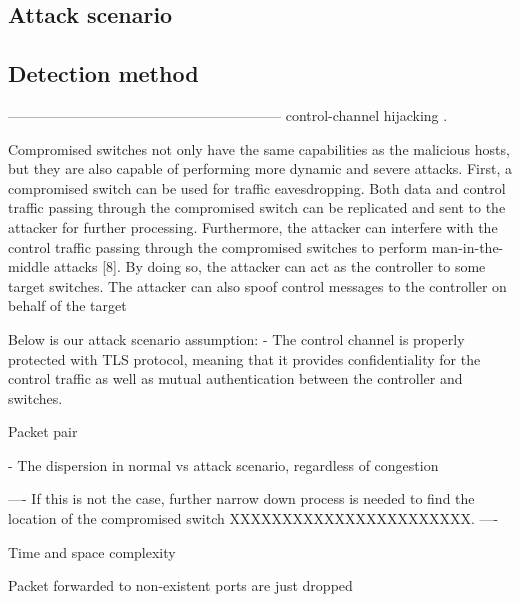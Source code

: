 \subsection{Attack scenario}
\subsection{Detection method}


-----------------------------------------------------------
control-channel hijacking \cite{AAS14}. 

Compromised switches not only have the same capabilities as the malicious hosts, but they are also capable of performing more dynamic and severe attacks.
First, a compromised switch can be used for traffic eavesdropping. Both data and control traffic passing through the compromised switch can be replicated and sent to the attacker for further processing. Furthermore, the attacker can interfere with the control traffic passing through the compromised
switches to perform man-in-the-middle attacks [8]. By doing so, the
attacker can act as the controller to some target switches. The attacker can
also spoof control messages to the controller on behalf of the target

Below is our attack scenario assumption: 
- The control channel is properly protected with TLS protocol, meaning
that it provides confidentiality for the control traffic as well as mutual
authentication between the controller and switches.

Packet pair

- The dispersion in normal vs attack scenario, regardless of congestion

----
If this is not the case, further narrow down process is needed to find the location of the compromised switch XXXXXXXXXXXXXXXXXXXXXXX.
----

Time and space complexity


Packet forwarded to non-existent ports are just dropped

